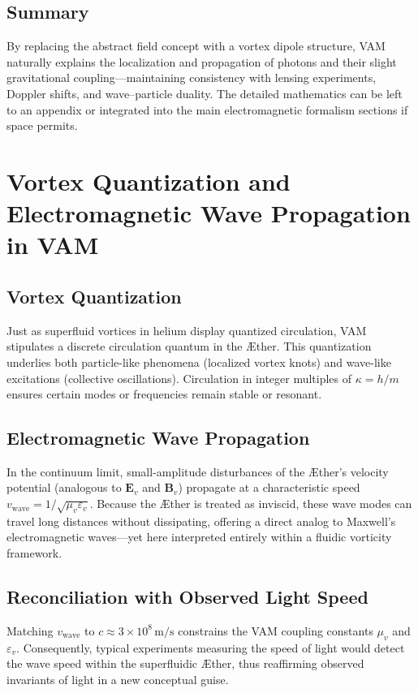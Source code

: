 \documentclass[a4paper,12pt]{article}
\begin{document}
\subsection{Summary}
By replacing the abstract field concept with a vortex dipole structure, VAM naturally explains the localization and propagation of photons and their slight gravitational coupling—maintaining consistency with lensing experiments, Doppler shifts, and wave–particle duality. The detailed mathematics can be left to an appendix or integrated into the main electromagnetic formalism sections if space permits.

\section{Vortex Quantization and Electromagnetic Wave Propagation in VAM}

\subsection{Vortex Quantization}
Just as superfluid vortices in helium display quantized circulation, VAM stipulates a discrete circulation quantum in the Æther. This quantization underlies both particle-like phenomena (localized vortex knots) and wave-like excitations (collective oscillations). Circulation in integer multiples of \( \kappa = h/m \) ensures certain modes or frequencies remain stable or resonant.

\subsection{Electromagnetic Wave Propagation}
In the continuum limit, small-amplitude disturbances of the Æther's velocity potential (analogous to \(\mathbf{E}_v\) and \(\mathbf{B}_v\)) propagate at a characteristic speed \(v_{\mathrm{wave}} = 1/\sqrt{\mu_v \varepsilon_v}\). Because the Æther is treated as inviscid, these wave modes can travel long distances without dissipating, offering a direct analog to Maxwell's electromagnetic waves—yet here interpreted entirely within a fluidic vorticity framework.

\subsection{Reconciliation with Observed Light Speed}
Matching \(v_{\mathrm{wave}}\) to \(c \approx 3\times 10^8\,\mathrm{m/s}\) constrains the VAM coupling constants \(\mu_v\) and \(\varepsilon_v\). Consequently, typical experiments measuring the speed of light would detect the wave speed within the superfluidic Æther, thus reaffirming observed invariants of light in a new conceptual guise.
\end{document}
